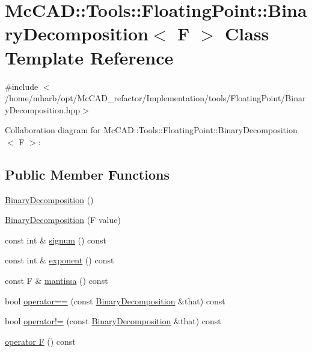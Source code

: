 \hypertarget{classMcCAD_1_1Tools_1_1FloatingPoint_1_1BinaryDecomposition}{}\section{Mc\+C\+AD\+:\+:Tools\+:\+:Floating\+Point\+:\+:Binary\+Decomposition$<$ F $>$ Class Template Reference}
\label{classMcCAD_1_1Tools_1_1FloatingPoint_1_1BinaryDecomposition}


{\ttfamily \#include $<$/home/mharb/opt/\+Mc\+C\+A\+D\+\_\+refactor/\+Implementation/tools/\+Floating\+Point/\+Binary\+Decomposition.\+hpp$>$}



Collaboration diagram for Mc\+C\+AD\+:\+:Tools\+:\+:Floating\+Point\+:\+:Binary\+Decomposition$<$ F $>$\+:
\subsection*{Public Member Functions}
\begin{DoxyCompactItemize}
\item 
\hyperlink{classMcCAD_1_1Tools_1_1FloatingPoint_1_1BinaryDecomposition_a966269e0382ff0f3dca52e4cbe606fc9}{Binary\+Decomposition} ()
\item 
\hyperlink{classMcCAD_1_1Tools_1_1FloatingPoint_1_1BinaryDecomposition_a21f54bc8a004daf31a4e70a45d9d358a}{Binary\+Decomposition} (F value)
\item 
const int \& \hyperlink{classMcCAD_1_1Tools_1_1FloatingPoint_1_1BinaryDecomposition_af475b04f2cc3c32c3f8962701711d554}{signum} () const
\item 
const int \& \hyperlink{classMcCAD_1_1Tools_1_1FloatingPoint_1_1BinaryDecomposition_a36f7c5ca38ca0c44cefb5e094ca55061}{exponent} () const
\item 
const F \& \hyperlink{classMcCAD_1_1Tools_1_1FloatingPoint_1_1BinaryDecomposition_a55553e96a50b4974dd8c8dfffdd26af1}{mantissa} () const
\item 
bool \hyperlink{classMcCAD_1_1Tools_1_1FloatingPoint_1_1BinaryDecomposition_a2fea4f7df1137b46f1ddc264aca03166}{operator==} (const \hyperlink{classMcCAD_1_1Tools_1_1FloatingPoint_1_1BinaryDecomposition}{Binary\+Decomposition} \&that) const
\item 
bool \hyperlink{classMcCAD_1_1Tools_1_1FloatingPoint_1_1BinaryDecomposition_ac7db22050714e18aa6368aa1350410d8}{operator!=} (const \hyperlink{classMcCAD_1_1Tools_1_1FloatingPoint_1_1BinaryDecomposition}{Binary\+Decomposition} \&that) const
\item 
\hyperlink{classMcCAD_1_1Tools_1_1FloatingPoint_1_1BinaryDecomposition_a758db6129cb4b3c74d41f7be3c24fdec}{operator F} () const
\end{DoxyCompactItemize}
